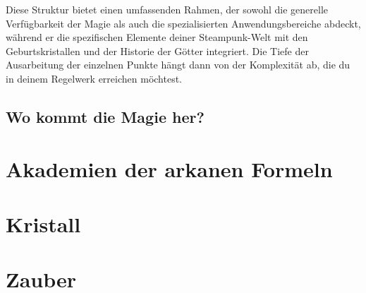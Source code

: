 \documentclass[10pt,a4paper,twocolumn,openany]{book}
\begin{document}
Diese Struktur bietet einen umfassenden Rahmen, der sowohl die generelle Verfügbarkeit der Magie als auch die spezialisierten Anwendungsbereiche abdeckt, während er die spezifischen Elemente deiner Steampunk-Welt mit den Geburtskristallen und der Historie der Götter integriert. Die Tiefe der Ausarbeitung der einzelnen Punkte hängt dann von der Komplexität ab, die du in deinem Regelwerk erreichen möchtest.







































\section{Wo kommt die Magie her?}

\chapter{Akademien der arkanen Formeln}

\chapter{Kristall}


\chapter{Zauber}





\rpgMakeMap[
image = Bilder/cover%
]
\end{document}
